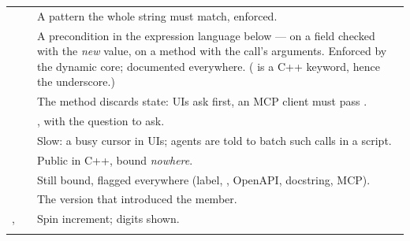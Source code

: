 \begin{center}
\begin{longtable}{@{}L{2.4cm}L{5.0cm}L{6.6cm}@{}}
\addlinespace
{} &  \newline {} &
  A pattern the whole string must match, enforced. \\
\addlinespace
{} & 
  \newline {} &
  A precondition in the expression language below --- on a field checked with
  the \emph{new} value, on a method with the call's arguments. Enforced by the
  dynamic core; documented everywhere. ( is a C++ keyword,
  hence the underscore.) \\
\addlinespace
{} &  \newline
   &
  The method discards state: UIs ask first, an MCP client must pass
  . \\
\addlinespace
{} &  \newline
   &
  , with the question to ask. \\
\addlinespace
{} &  \newline {} &
  Slow: a busy cursor in UIs; agents are told to batch such calls in a script. \\
\addlinespace
{} &  \newline {} &
  Public in C++, bound \emph{nowhere}. \\
\addlinespace
{} &  \newline
   &
  Still bound, flagged everywhere (label, , OpenAPI,
  docstring, MCP). \\
\addlinespace
{} &  \newline {} &
  The version that introduced the member. \\
\addlinespace
{},  &  \newline
   &
  Spin increment; digits shown. \\
\addlinespace
{} &  \newline {} &

\end{longtable}
\end{center}
